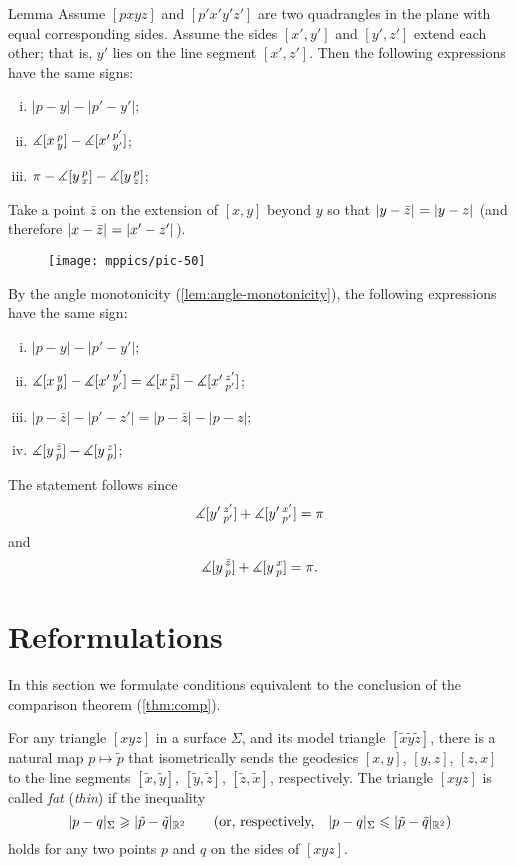 \begin{thm}{Lemma}
\label{lem:alex}
Assume $[pxyz]$ and $[p'x'y'z']$ are two quadrangles in the plane with equal corresponding sides.
Assume the sides $[x',y']$ and $[y',z']$ extend each other; that is, $y'$ lies on the line segment $[x',z']$.
Then the following expressions have the same signs:
\begin{enumerate}[(i)]
 \item $|p-y|-|p'-y'|$;
 \item $\measuredangle[x\,{}^{p}_{y}]-\measuredangle[x'\,{}^{p'}_{y'}]$;
 \item $\pi-\measuredangle[y\,{}^{p}_{x}]-\measuredangle[y\,{}^{p}_{z}]$;
\end{enumerate}
\end{thm}

Take 
a point $\bar z$ on the extension of 
$[x,y]$ beyond $y$ so that $\dist{y}{\bar z}{}=\dist{y}{z}{}$ (and therefore $\dist{x}{\bar z}{}=\dist{x'}{z'}{}$). 
 
\begin{figure}[!ht]
\vskip-0mm
\centering
\texttt{[image: mppics/pic-50]}
\vskip-0mm
\end{figure}

By the angle monotonicity (\ref{lem:angle-monotonicity}), 
the following expressions have the same sign:
\begin{enumerate}[(i)]
\item $|p-y|-|p'-y'|$;
\item $\measuredangle[x\,{}^{y}_{p}]-\measuredangle[x'\,{}^{y'}_{p'}]=\measuredangle[x\,{}^{\bar z}_{p}]-\measuredangle[x'\,{}^{z'}_{p'}]$;
\item $|p-\bar z|-|p'-z'| = | p - \bar z | - | p-z | $;
\item $\measuredangle[y\,{}^{\bar z}_{p}]-\measuredangle[y\,{}^{z}_{p}]$;
\end{enumerate}
The statement follows since
\[\measuredangle[y'\,{}^{z'}_{p'}]+\measuredangle[y'\,{}^{x'}_{p'}]=\pi\]
and
\[\measuredangle[y\,{}^{\bar z}_{p}]+\measuredangle[y\,{}^{x}_{p}]=\pi.\]
\qedsf

\section{Reformulations}

In this section we formulate conditions equivalent to the conclusion of the comparison theorem (\ref{thm:comp}).

For any triangle $[xyz]$ in a surface $\Sigma$, and its model triangle $[\tilde x \tilde y \tilde z]$, there is a natural map $p\mapsto \tilde p$ that isometrically sends the geodesics $[x,y]$, $[y,z]$, $[z,x]$ to the line segments $[\tilde x,\tilde y ]$, $[\tilde y , \tilde z]$, $[ \tilde z , \tilde x ]$, respectively.
The triangle $[xyz]$ is called \emph{fat} (\emph{thin})
if the inequality
\[\dist{p}{q}{\Sigma}\ge |\tilde p- \tilde q|_{\mathbb{R}^2}\qquad \text{(or, respectively,}\quad \dist{p}{q}{\Sigma}\le |\tilde p- \tilde q|_{\mathbb{R}^2})\]
holds for any two points $p$ and $q$ on the sides of $[xyz]$.

